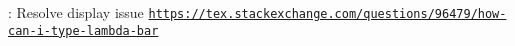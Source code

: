 
\begin{DoxyRefList}
\item[\label{todo__todo000001}%
\Hypertarget{todo__todo000001}%
Module \hyperlink{group___n_i_s_t_const}{N\+I\+S\+T\+Const} ]\+: Resolve  display issue \href{https://tex.stackexchange.com/questions/96479/how-can-i-type-lambda-bar}{\tt https\+://tex.\+stackexchange.\+com/questions/96479/how-\/can-\/i-\/type-\/lambda-\/bar} 
\end{DoxyRefList}